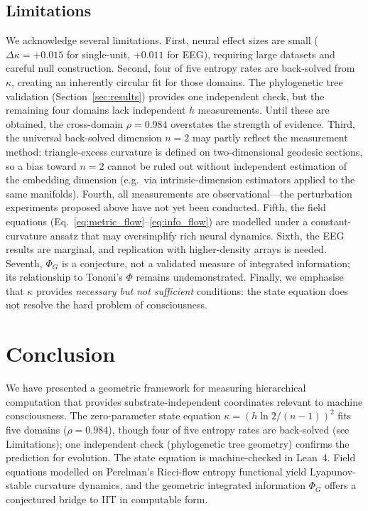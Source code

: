 \documentclass[letterpaper]{article}
\begin{document}
\subsection{Limitations}

We acknowledge several limitations.
First, neural effect sizes are small
($\Delta\kappa=+0.015$ for single-unit, $+0.011$ for
EEG), requiring large datasets and careful null
construction.
Second, four of five entropy rates are back-solved
from $\kappa$, creating an inherently circular fit for
those domains.
The phylogenetic tree validation
(Section~\ref{sec:results}) provides one independent
check, but the remaining four domains lack independent
$h$ measurements.
Until these are obtained, the cross-domain
$\rho=0.984$ overstates the strength of evidence.
Third, the universal back-solved dimension $n=2$ may
partly reflect the measurement method: triangle-excess
curvature is defined on two-dimensional geodesic
sections, so a bias toward $n=2$ cannot be ruled out
without independent estimation of the embedding
dimension (e.g.\ via intrinsic-dimension estimators
applied to the same manifolds).
Fourth, all measurements are observational---the
perturbation experiments proposed above have not yet
been conducted.
Fifth, the field equations
(Eq.~\ref{eq:metric_flow}--\ref{eq:info_flow}) are
modelled under a constant-curvature ansatz that may
oversimplify rich neural dynamics.
Sixth, the EEG results are marginal, and replication
with higher-density arrays is needed.
Seventh, $\Phi_G$ is a conjecture, not a validated
measure of integrated information; its relationship
to Tononi's $\Phi$ remains undemonstrated.
Finally, we emphasise that $\kappa$ provides
\emph{necessary but not sufficient} conditions: the
state equation does not resolve the hard problem of
consciousness.

\section{Conclusion}\label{sec:conclusion}

We have presented a geometric framework for measuring
hierarchical computation that provides substrate-independent
coordinates relevant to machine consciousness.
The zero-parameter state equation
$\kappa=(h\ln 2/(n{-}1))^2$ fits five domains
($\rho=0.984$), though four of five entropy rates are
back-solved (see Limitations); one independent check
(phylogenetic tree geometry) confirms the prediction
for evolution.
The state equation is machine-checked in Lean~4.
Field equations modelled on Perelman's Ricci-flow
entropy functional yield Lyapunov-stable curvature
dynamics, and the geometric integrated information
$\Phi_G$ offers a conjectured bridge to IIT in
computable form.
\end{document}

